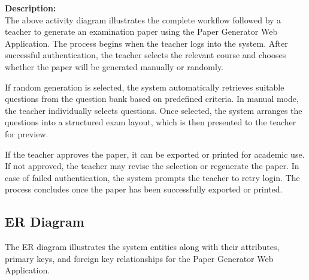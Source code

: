 \documentclass[12pt]{article}
\begin{document}
\noindent\textbf{Description:} \\
The above activity diagram illustrates the complete workflow followed by a teacher to generate an examination paper using the Paper Generator Web Application. The process begins when the teacher logs into the system. After successful authentication, the teacher selects the relevant course and chooses whether the paper will be generated manually or randomly.

If random generation is selected, the system automatically retrieves suitable questions from the question bank based on predefined criteria. In manual mode, the teacher individually selects questions. Once selected, the system arranges the questions into a structured exam layout, which is then presented to the teacher for preview.

If the teacher approves the paper, it can be exported or printed for academic use. If not approved, the teacher may revise the selection or regenerate the paper. In case of failed authentication, the system prompts the teacher to retry login. The process concludes once the paper has been successfully exported or printed.


\subsection{ER Diagram}

The  ER diagram illustrates the system entities along with their
attributes, primary keys, and foreign key relationships for the Paper
Generator Web Application.
\end{document}
